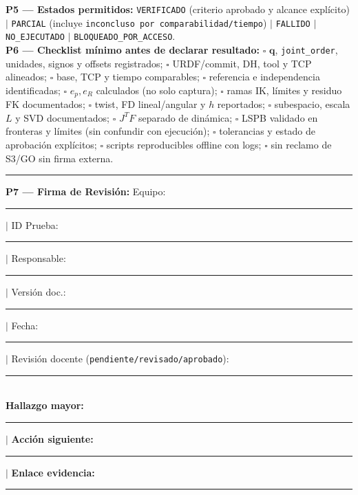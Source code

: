 \documentclass[10pt, a4paper]{article}
\begin{document}
\begin{landscape}
\vspace{0.2cm}
\begin{tcolorbox}[colback=white, colframe=ucbblue, title=\textbf{P5 (Estados Formales), P6 (Checklist Estudiantil) y P7 (Firma de Revisión)}, left=2mm, right=2mm, top=1.5mm, bottom=1.5mm]
    \scriptsize\raggedright
    \textbf{P5 — Estados permitidos:} \texttt{VERIFICADO} (criterio aprobado y alcance explícito) $\mid$ \texttt{PARCIAL} (incluye \texttt{inconcluso por comparabilidad/tiempo}) $\mid$ \texttt{FALLIDO} $\mid$ \texttt{NO\_EJECUTADO} $\mid$ \texttt{BLOQUEADO\_POR\_ACCESO}.\\[0.15cm]
    \textbf{P6 — Checklist mínimo antes de declarar resultado:}
    $\square$ $\mathbf{q}$, \texttt{joint\_order}, unidades, signos y offsets registrados;
    $\square$ URDF/commit, DH, tool y TCP alineados;
    $\square$ base, TCP y tiempo comparables;
    $\square$ referencia e independencia identificadas;
    $\square$ $e_p, e_R$ calculados (no solo captura);
    $\square$ ramas IK, límites y residuo FK documentados;
    $\square$ twist, FD lineal/angular y $h$ reportados;
    $\square$ subespacio, escala $L$ y SVD documentados;
    $\square$ $J^T F$ separado de dinámica;
    $\square$ LSPB validado en fronteras y límites (sin confundir con ejecución);
    $\square$ tolerancias y estado de aprobación explícitos;
    $\square$ scripts reproducibles offline con logs;
    $\square$ sin reclamo de S3/GO sin firma externa.\\[0.15cm]
    \hrule\vspace{0.15cm}
    \textbf{P7 — Firma de Revisión:} Equipo: \rule{2.2cm}{0.15mm} $\mid$ ID Prueba: \rule{2.2cm}{0.15mm} $\mid$ Responsable: \rule{3.5cm}{0.15mm} $\mid$ Versión doc.: \rule{2cm}{0.15mm} $\mid$ Fecha: \rule{2.2cm}{0.15mm} $\mid$ Revisión docente (\texttt{pendiente/revisado/aprobado}): \rule{3.5cm}{0.15mm}\\
    \textbf{Hallazgo mayor:} \rule{7cm}{0.15mm} $\mid$ \textbf{Acción siguiente:} \rule{6cm}{0.15mm} $\mid$ \textbf{Enlace evidencia:} \rule{4.5cm}{0.15mm}
\end{tcolorbox}
\end{landscape}
\end{document}
